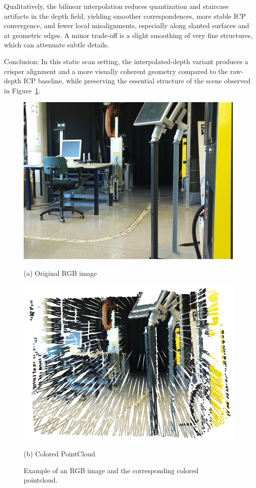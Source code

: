 \documentclass[english, bachelor, utf8]{base/thesis_telematics}
\begin{document}
Qualitatively, the bilinear interpolation reduces quantization and staircase artifacts in the depth field,
yielding smoother correspondences, more stable ICP convergence, and fewer local misalignments, especially
along slanted surfaces and at geometric edges. A minor trade-off is a slight smoothing of very fine
structures, which can attenuate subtle details.

Conclusion: In this static scan setting, the interpolated-depth variant produces a crisper alignment and a
more visually coherent geometry compared to the raw-depth ICP baseline, while preserving the essential
structure of the scene observed in Figure~\ref{fig:rgb_sparse}.

\begin{figure}[H]
  \centering
  \begin{minipage}{0.48\textwidth}
    \centering
    \includegraphics[width=\linewidth]{pics/KUKA_LAB_RGB.png}
    \caption*{(a) Original RGB image}
    \label{fig:col_pcl}
  \end{minipage}\hfill
  \begin{minipage}{0.48\textwidth}
    \centering
    \includegraphics[width=\linewidth]{pics/KUKA_Lab_colored_plc.png}
    \caption*{(b) Colored PointCloud}
  \end{minipage}
  \caption{Example of an RGB image and the corresponding colored pointcloud.}
  \label{fig:rgb_sparse}
\end{figure}
\end{document}
